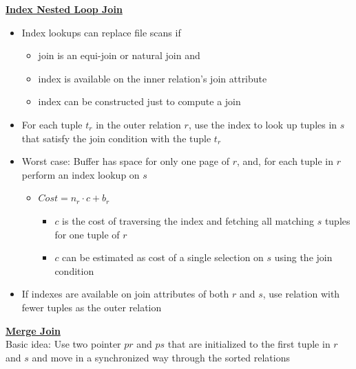 \bigskip
\textbf{\underline{Index Nested Loop Join}}\\
\begin{itemize}[label=\(\rhd\)]
    \item Index lookups can replace file scans if
    \begin{itemize}[label=\(\rhd\)]
        \item join is an equi-join or natural join and
        \item index is available on the inner relation's join attribute
        \item index can be constructed just to compute a join
    \end{itemize}
    \item For each tuple $t_r$ in the outer relation $r$, use the index to look up tuples in $s$ that satisfy the join condition with the tuple $t_r$
    \item Worst case: Buffer has space for only one page of $r$, and, for each tuple in $r$ perform an index lookup on $s$
    \begin{itemize}[label=\(\rhd\)]
        \item $Cost = n_r \cdot c + b_r$
        \begin{itemize}[label=\(\rhd\)]
            \item $c$ is the cost of traversing the index and fetching all matching $s$ tuples for one tuple of $r$
            \item $c$ can be estimated as cost of a single selection on $s$ using the join condition
        \end{itemize}
    \end{itemize}
    \item If indexes are available on join attributes of both $r$ and $s$, use relation with fewer tuples as the outer relation
\end{itemize}

\bigskip
\textbf{\underline{Merge Join}}\\

Basic idea: Use two pointer $pr$ and $ps$ that are initialized to the first tuple in $r$ and $s$ and move in a synchronized way through the sorted relations\\

